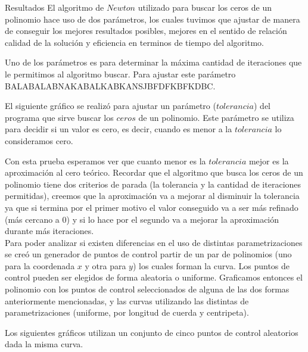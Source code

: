 \begin{section}{Resultados}
	El algoritmo de $Newton$ utilizado para buscar los ceros de un polinomio hace uso de dos parámetros, los cuales tuvimos que ajustar de manera de conseguir los mejores resultados posibles, mejores en el sentido de relación calidad de la solución y eficiencia en terminos de tiempo del algoritmo.
	
	Uno de los parámetros es para determinar la máxima cantidad de iteraciones que le permitimos al algoritmo buscar. Para ajustar este parámetro BALABALABNAKABALKABKANSJBFDFKBFKDBC.

	El siguiente gráfico se realizó para ajustar un parámetro ($tolerancia$) del programa que sirve buscar los $ceros$ de un polinomio. Este parámetro se utiliza para decidir si un valor es cero, es decir, cuando es menor a la $tolerancia$ lo consideramos cero.
	
	Con esta prueba esperamos ver que cuanto menor es la $tolerancia$ mejor es la aproximación al cero teórico. Recordar que el algoritmo que busca los ceros de un polinomio tiene dos criterios de parada (la tolerancia y la cantidad de iteraciones permitidas), creemos que la aproximación va a mejorar al disminuir la tolerancia ya que si termina por el primer motivo el valor conseguido va a ser más refinado (más cercano a 0) y si lo hace por el segundo va a mejorar la aproximación durante más iteraciones.\\
	
	Para poder analizar si existen diferencias en el uso de distintas parametrizaciones se creó un generador de puntos de control partir de un par de polinomios (uno para la coordenada $x$ y otra para $y$) los cuales forman la curva. Los puntos de control pueden ser elegidos de forma aleatoria o uniforme. Graficamos entonces el polinomio con los puntos de control seleccionados de alguna de las dos formas anteriormente mencionadas, y las curvas utilizando las distintas de parametrizaciones (uniforme, por longitud de cuerda y centripeta).
	
	Los siguientes gráficos utilizan un conjunto de cinco puntos de control aleatorios dada la misma curva.
	

\end{section}
